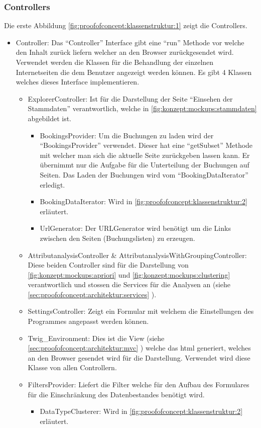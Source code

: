 \subsubsection{Controllers}
\label{sec:proofofconcept:klassenstruktur:controllers}
Die erste Abbildung \cref{fig:proofofconcept:klassenstruktur:1} zeigt die Controllers. 
\begin{itemize}
	 \item Controller: Das "`Controller"' Interface gibt eine "`run"' Methode vor welche den Inhalt zurück liefern welcher an den Browser zurückgesendet wird. Verwendet werden die Klassen für die Behandlung der einzelnen Internetseiten die dem Benutzer angezeigt werden können. Es gibt 4 Klassen welches dieses Interface implementieren.
	 \begin{itemize}
		\item ExplorerController: Ist für die Darstellung der Seite "`Einsehen der Stammdaten"' verantwortlich, welche in \cref{fig:konzept:mockups:stammdaten} abgebildet ist.
			\begin{itemize}
				\item BookingsProvider: Um die Buchungen zu laden wird der "`BookingsProvider"' verwendet. Dieser hat eine "`getSubset"' Methode mit welcher man sich die aktuelle Seite zurückgeben lassen kann. Er übernimmt nur die Aufgabe für die Unterteilung der Buchungen auf Seiten. Das Laden der Buchungen wird vom "`BookingDataIterator"' erledigt.
				\item BookingDataIterator: Wird in \cref{fig:proofofconcept:klassenstruktur:2} erläutert.
				\item UrlGenerator: Der URLGenerator wird benötigt um die Links zwischen den Seiten (Buchungslisten) zu erzeugen.
			\end{itemize}
		\item AttributanalysisController \& AttributanalysisWithGroupingController: Diese beiden Controller sind für die Darstellung von \cref{fig:konzept:mockups:apriori} und \cref{fig:konzept:mockups:clustering} verantwortlich und stossen die Services für die Analysen an (siehe \cref{sec:proofofconcept:architektur:services} ). 
		\item SettingsController: Zeigt ein Formular mit welchem die Einstellungen des Programmes angepasst werden können.
		\item Twig\_Environment: Dies ist die View (siehe \cref{sec:proofofconcept:architektur:mvc} ) welche das \gls{html} generiert, welches an den Browser gesendet wird für die Darstellung. Verwendet wird diese Klasse von allen Controllern.
		\item FiltersProvider: Liefert die Filter welche für den Aufbau des Formulares für die Einschränkung des Datenbestandes benötigt wird.
			\begin{itemize}
				\item DataTypeClusterer: Wird in \cref{fig:proofofconcept:klassenstruktur:2} erläutert.
			\end{itemize}
	 \end{itemize}
\end{itemize}


